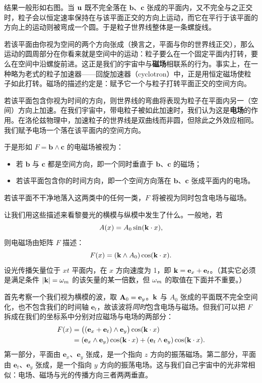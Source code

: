 
结果一般形如右图。当 $\mathbf{u}$ 既不完全落在 $\mathbf{b}$、$\mathbf{c}$ 张成的平面内，又不完全与之正交时，粒子会以恒定速率保持在与该平面正交的方向上运动，而它在平行于该平面的方向上的运动则被弯成一个圆。于是粒子世界线整体是一条螺旋线。

若该平面由你视为空间的两个方向张成（换言之，平面与你的世界线正交），那么运动的圆周部分在你看来就是空间中的运动：粒子要么在一个固定平面内打转，要么在空间中沿螺旋前进。这正是我们的宇宙中与\textbf{磁场}相联系的行为。事实上，在一种略为老式的粒子加速器——回旋加速器（cyclotron）中，正是用恒定磁场使粒子如此打转。磁场的描述约定是：赋予它一个与粒子打转平面正交的空间方向。

若该平面包含你视为时间的方向，则世界线的弯曲将表现为粒子在平面内另一（空间）方向上加速。在我们宇宙中，带电粒子被如此加速时，我们认为这是\textbf{电场}的作用。在洛伦兹物理中，加速粒子的世界线是双曲线而非圆，但除此之外效应相同。我们赋予电场一个落在该平面内的空间方向。

于是形如 $F = \mathbf{b}\wedge\mathbf{c}$ 的电磁场被视为：
\begin{itemize}
\item 若 $\mathbf{b}$ 与 $\mathbf{c}$ 都是空间方向，即一个同时垂直于 $\mathbf{b}$、$\mathbf{c}$ 的磁场；
\item 若该平面包含你的时间方向，即一个空间方向落在 $\mathbf{b}$、$\mathbf{c}$ 张成平面内的电场。
\end{itemize}
若该平面不干净地落入这两类中的任何一类，$F$ 将被视为同时包含电场与磁场。

让我们用这些描述来看黎曼光的横模与纵模中发生了什么。一般地，若
\[
A(x) = A_0 \sin(\mathbf{k}\cdot x),
\]
则电磁场由矩阵 $F$ 描述：
\[
F(x) = (\mathbf{k} \wedge A_0)\cos(\mathbf{k}\cdot x).
\]
设光传播矢量位于 $xt$ 平面内，在 $x$ 方向速度为 1，即 $\mathbf{k} = \mathbf{e}_x + \mathbf{e}_t$。（其实它必须是满足条件 $|\mathbf{k}| = \omega_m$ 的该矢量的某一倍数，但 $\omega_m$ 的取值在下面并不重要。）

首先考察一个我们视为横模的波，取 $\mathbf{A}_0 = \mathbf{e}_y$。$\mathbf{k}$ 与 $A_0$ 张成的平面既不完全空间化，也不包含我们的时间轴 $\mathbf{e}_t$，故该波将\emph{同时}包含电场与磁场。但我们可以把 $F$ 拆成在我们的坐标系中分别对应磁场与电场的两部分：
\[
\begin{aligned}
F(x) &= \big((\mathbf{e}_x + \mathbf{e}_t)\wedge \mathbf{e}_y\big)\cos(\mathbf{k}\cdot x) \\
     &= (\mathbf{e}_x \wedge \mathbf{e}_y)\cos(\mathbf{k}\cdot x) + (\mathbf{e}_t \wedge \mathbf{e}_y)\cos(\mathbf{k}\cdot x).
\end{aligned}
\]
第一部分，平面由 $\mathbf{e}_x$、$\mathbf{e}_y$ 张成，是一个指向 $z$ 方向的振荡磁场。第二部分，平面由 $\mathbf{e}_t$、$\mathbf{e}_y$ 张成，是一个指向 $y$ 方向的振荡电场。这与我们自己宇宙中的光非常相似：电场、磁场与光的传播方向三者两两垂直。

